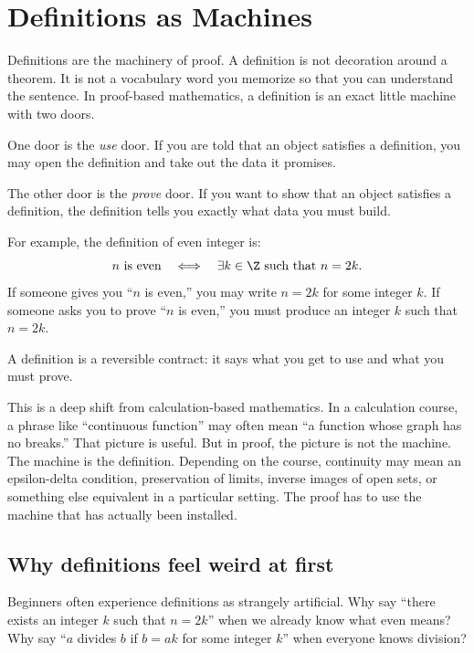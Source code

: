 \section{Definitions as Machines}

Definitions are the machinery of proof. A definition is not decoration around a theorem. It is not a vocabulary word you memorize so that you can understand the sentence. In proof-based mathematics, a definition is an exact little machine with two doors.

One door is the \emph{use} door. If you are told that an object satisfies a definition, you may open the definition and take out the data it promises.

The other door is the \emph{prove} door. If you want to show that an object satisfies a definition, the definition tells you exactly what data you must build.

For example, the definition of even integer is:
\[
n\text{ is even}\quad\Longleftrightarrow\quad \exists k\in\Z\text{ such that }n=2k.
\]
If someone gives you ``$n$ is even,'' you may write $n=2k$ for some integer $k$. If someone asks you to prove ``$n$ is even,'' you must produce an integer $k$ such that $n=2k$.

\begin{focusbox}
A definition is a reversible contract: it says what you get to use and what you must prove.
\end{focusbox}

This is a deep shift from calculation-based mathematics. In a calculation course, a phrase like ``continuous function'' may often mean ``a function whose graph has no breaks.'' That picture is useful. But in proof, the picture is not the machine. The machine is the definition. Depending on the course, continuity may mean an epsilon-delta condition, preservation of limits, inverse images of open sets, or something else equivalent in a particular setting. The proof has to use the machine that has actually been installed.

\subsection{Why definitions feel weird at first}

Beginners often experience definitions as strangely artificial. Why say ``there exists an integer $k$ such that $n=2k$'' when we already know what even means? Why say ``$a$ divides $b$ if $b=ak$ for some integer $k$'' when everyone knows division?

